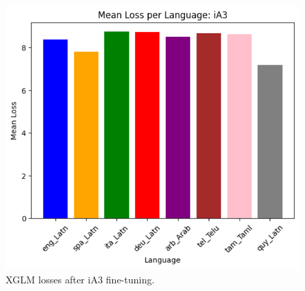 \documentclass[11pt]{article}
\begin{document}
\begin{figure}[ht]
\centering
\includegraphics[width=0.9\columnwidth]{loss_iA3.png}
\caption{XGLM losses after iA3 fine-tuning.}
\label{loss_iA3}
\end{figure}


\newpage
\end{document}
